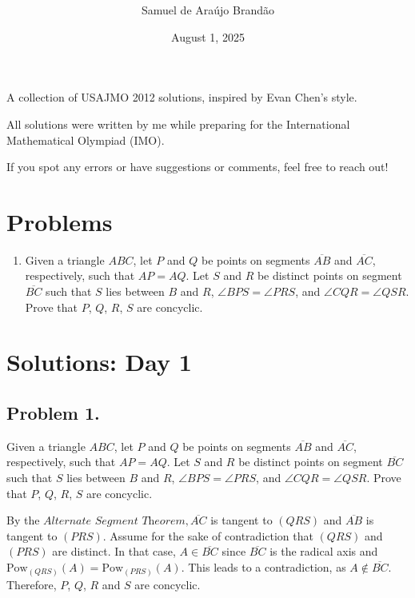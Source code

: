 \documentclass[12pt]{artilcle}
\title{\bfseries\sffamily{USAJMO 2012 Solutions}}
\author{Samuel de Araújo Brandão}
\date{August 1, 2025}
\begin{document}
  \maketitle
  A collection of USAJMO 2012 solutions, inspired by Evan Chen’s style.

  All solutions were written by me while preparing for the International Mathematical Olympiad (IMO).

  If you spot any errors or have suggestions or comments, feel free to reach out!
  \tableofcontents
  \clearpage

  \section{\textsf{Problems}}
  \begin{enumerate}[label=\textbf{\arabic*.}]
    \item Given a triangle $ABC$, let $P$ and $Q$ be points on segments $\overline{AB}$ and $\overline{AC}$,
    respectively, such that $AP = AQ$. Let $S$ and $R$ be distinct points on segment $\overline{BC}$
    such that $S$ lies between $B$ and $R$, $\angle BPS = \angle PRS$, and $\angle CQR = \angle QSR$.
    Prove that $P$, $Q$, $R$, $S$ are concyclic.
  \end{enumerate}

  \clearpage

  \section{\textsf{Solutions: Day 1}}
    \subsection{Problem 1.}

      \begin{tcolorbox}[problembox=Problem statement]
        Given a triangle $ABC$, let $P$ and $Q$ be points on segments $\overline{AB}$ and $\overline{AC}$,
        respectively, such that $AP = AQ$. Let $S$ and $R$ be distinct points on segment $\overline{BC}$
        such that $S$ lies between $B$ and $R$, $\angle BPS = \angle PRS$, and $\angle CQR = \angle QSR$.
        Prove that $P$, $Q$, $R$, $S$ are concyclic.
      \end{tcolorbox}
      By the $\textit{Alternate Segment Theorem}, \overline{AC}$ is tangent to $(QRS)$ and $\overline{AB}$
      is tangent to $(PRS)$. Assume for the sake of contradiction that $(QRS)$ and $(PRS)$ are distinct. In that case,
      $A \in \overline{BC}$ since $\overline{BC}$ is the radical axis and $\text{Pow}_{(QRS)}(A) =
      \text{Pow}_{(PRS)}(A)$. This leads to a contradiction, as $A \notin \overline{BC}$. Therefore,
      $P$, $Q$, $R$ and $S$ are concyclic.
\end{document}
